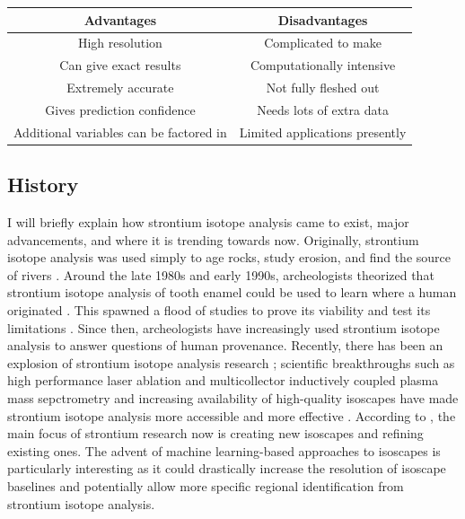 \documentclass[a4paper, 12pt]{article}
\begin{document}
\begin{center}
    \begin{tabular}{||c | c||}
        \hline
        Advantages                              & Disadvantages                  \\ [0.5ex]
        \hline\hline
        High resolution                         & Complicated to make            \\
        \hline
        Can give exact results                  & Computationally intensive      \\
        \hline
        Extremely accurate                      & Not fully fleshed out          \\
        \hline
        Gives prediction confidence             & Needs lots of extra data       \\
        \hline
        Additional variables can be factored in & Limited applications presently \\[1ex]
        \hline
    \end{tabular}
\end{center}


\subsection{History}
I will briefly explain how strontium isotope analysis came to exist, major advancements,
and where it is trending towards now. Originally, strontium isotope analysis was used simply to age rocks, study erosion, and
find the source of rivers \citep*{moorbath1965, crowley2017}. Around the late 1980s and early 1990s, archeologists theorized
that strontium isotope analysis of tooth enamel could be used to learn where a human originated \citep{crowley2017}. This spawned
a flood of studies to prove its viability and test its limitations \citep{crowley2017}.
Since then, archeologists have increasingly used strontium isotope analysis to answer
questions of human provenance. Recently, there has been an explosion of strontium
isotope analysis research \citep{crowley2017}; scientific
breakthroughs such as high performance laser ablation and multicollector inductively coupled
plasma mass sepctrometry and increasing availability of high-quality isoscapes \citep{crowley2017}
have made strontium isotope analysis more accessible and more effective \citep{holt2021}.
According to \cite{holt2021}, the main focus of strontium research now is creating new isoscapes
and refining existing ones. The advent of machine learning-based approaches to isoscapes
is particularly interesting as it could drastically increase the resolution of isoscape
baselines and potentially allow more specific regional identification from strontium
isotope analysis.
\end{document}
